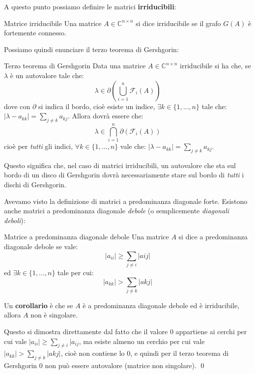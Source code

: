 \documentclass[a4paper,11pt]{article}
\begin{document}
A questo punto possiamo definire le matrici \textbf{irriducibili}:
\begin{definition}{Matrice irriducibile}
	Una matrice $A \in \mathbb{C}^{n \times n}$ si dice irriducibile se il grafo $G(A)$ è fortemente connesso.
\end{definition}

Possiamo quindi enunciare il terzo teorema di Gershgorin:
\begin{theorem}{Terzo teorema di Gershgorin}
	Data una matrice $A \in \mathbb{C}^{n \times n}$ irriducibile si ha che, se $\lambda$ è un autovalore tale che:
	$$
		\lambda \in \partial \left( \bigcup_{i = 1}^n \mathcal{F}_i(A) \right)
	$$
	dove con $\partial$ si indica il bordo, cioè esiste un indice, $\exists k \in \{ 1, ..., n \}$ tale che:
	$
	|\lambda - a_{kk}| = \sum_{j \neq k} a_{kj}
	$.
	Allora dovrà essere che:
	$$
		\lambda \in \bigcap_{i = 1}^n \partial \left( \mathcal{F}_i(A) \right)
	$$
	cioè per \textit{tutti} gli indici, $\forall k \in \{ 1, ..., n \}$ vale che:
	$
	|\lambda - a_{kk}| = \sum_{j \neq k} a_{kj}
	$.

\end{theorem}

Questo significa che, nel caso di matrici irriducibili, un autovalore che sta sul bordo di un disco di Gershgorin dovrà necessariamente stare sul bordo di \textit{tutti} i dischi di Gershgorin.

Avevamo visto la definizione di matrici a predominanza diagonale forte.
Esistono anche matrici a predominanza diagonale \textit{debole} (o semplicemente \textit{diagonali deboli}):
\begin{definition}{Matrice a predominanza diagonale debole}
	Una matrice $A$ si dice a predominanza diagonale debole se vale:
	$$
	|a_{ii}| \geq \sum_{j \neq i} |a{ij}|
	$$
	ed $\exists k \in \{ 1, ..., n \}$ tale per cui:
	$$
	|a_{kk}| > \sum_{j \neq k} |a{kj}|
	$$
\end{definition}

Un \textbf{corollario} è che se $A$ è a predominanza diagonale debole ed è irriducibile, allora $A$ non è singolare.

Questo si dimostra direttamente dal fatto che il valore $0$ appartiene ai cerchi per cui vale $|a_{ii}| \geq \sum_{j \neq i} |a_{ij}$, ma esiste almeno un cerchio per cui vale $|a_{kk}| > \sum_{j \neq k} |a{kj}|$, cioè non contiene lo $0$, e quindi per il terzo teorema di Gershgorin $0$ non può essere autovalore (matrice non singolare). \qed
\end{document}
